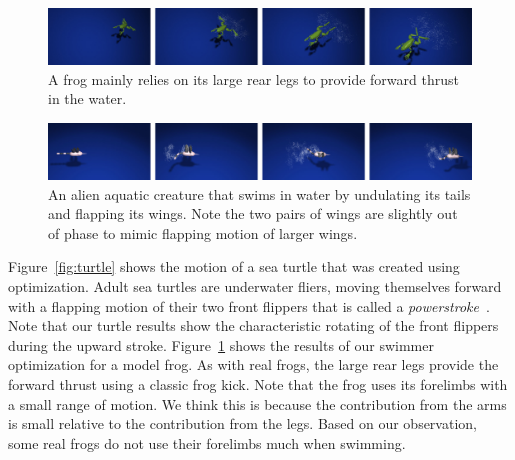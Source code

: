\begin{figure}[ht]
\centering
\includegraphics[width=\textwidth]{figures/frog.eps}
\caption{A frog mainly relies on its large rear legs to provide forward thrust in the water.}
\label{fig:frog}
\end{figure}


\begin{figure}[ht]
\centering
\includegraphics[width=\textwidth]{figures/alien.eps}
\caption{An alien aquatic creature that swims in water by undulating its tails and flapping its wings. Note the two pairs of wings are slightly out of phase to mimic flapping motion of larger wings.}
\label{fig:alien}
\end{figure}




Figure~\ref{fig:turtle} shows the motion of a sea turtle that was created
using optimization.  Adult sea turtles are underwater fliers, moving
themselves forward with a flapping motion of their two front flippers that
is called a \emph{powerstroke}~\cite{wyneken1997}.  Note that our turtle
results show the characteristic rotating of the front flippers during the
upward stroke.  Figure~\ref{fig:frog} shows the results of our swimmer
optimization for a model frog.  As with real frogs, the large rear legs
provide the forward thrust using a classic frog kick. Note that the frog uses its forelimbs with a small range of motion. We think this is because the contribution from the arms is small relative to the contribution from the legs. Based on our observation, some real frogs do not use their forelimbs much when swimming.

